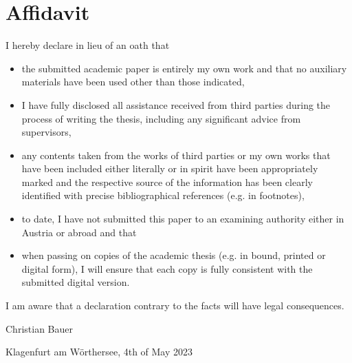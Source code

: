 \section*{Affidavit}
\label{sec:affidavit}

    I hereby declare in lieu of an oath that

    \begin{itemize}
        \item the submitted academic paper is entirely my own work and that no auxiliary materials have been used other than those indicated,
        \item I have fully disclosed all assistance received from third parties during the process of writing the thesis, including any significant advice from supervisors,
        \item any contents taken from the works of third parties or my own works that have been included either literally or in spirit have been appropriately marked and the respective source of the information has been clearly identified with precise bibliographical references (e.g. in footnotes),
        \item to date, I have not submitted this paper to an examining authority either in Austria or abroad and that
        \item when passing on copies of the academic thesis (e.g. in bound, printed or digital form), I will ensure that each copy is fully consistent with the submitted digital version.
    \end{itemize}

    I am aware that a declaration contrary to the facts will have legal consequences.

    \vfill
    \begin{minipage}{.5\textwidth}
        Christian Bauer
        
    \end{minipage}%
    \begin{minipage}{.5\textwidth}
        Klagenfurt am Wörthersee, 4th of May 2023
    \end{minipage}
